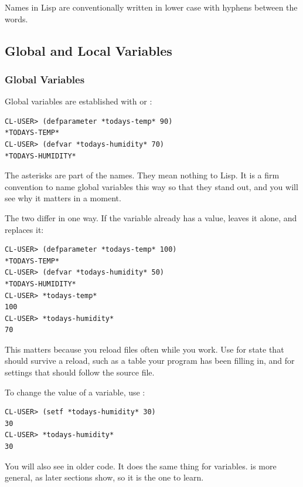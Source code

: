 Names in Lisp are conventionally written in lower case with hyphens
between the words.

\subsection{Global and Local Variables}
\label{sec:variables}

\subsubsection{Global Variables}

Global variables are established with  or
:

\begin{verbatim}
CL-USER> (defparameter *todays-temp* 90)
*TODAYS-TEMP*
CL-USER> (defvar *todays-humidity* 70)
*TODAYS-HUMIDITY*
\end{verbatim}

The asterisks are part of the names. They mean nothing to Lisp. It
is a firm convention to name global variables this way so that they
stand out, and you will see why it matters in a moment.

The two differ in one way. If the variable already has a value,
 leaves it alone, and  replaces it:

\begin{verbatim}
CL-USER> (defparameter *todays-temp* 100)
*TODAYS-TEMP*
CL-USER> (defvar *todays-humidity* 50)
*TODAYS-HUMIDITY*
CL-USER> *todays-temp*
100
CL-USER> *todays-humidity*
70
\end{verbatim}

This matters because you reload files often while you work. Use
 for state that should survive a reload, such as a table
your program has been filling in, and  for settings
that should follow the source file.

To change the value of a variable, use :

\begin{verbatim}
CL-USER> (setf *todays-humidity* 30)
30
CL-USER> *todays-humidity*
30
\end{verbatim}

You will also see  in older code. It does the same thing
for variables.  is more general, as later sections show,
so it is the one to learn.

